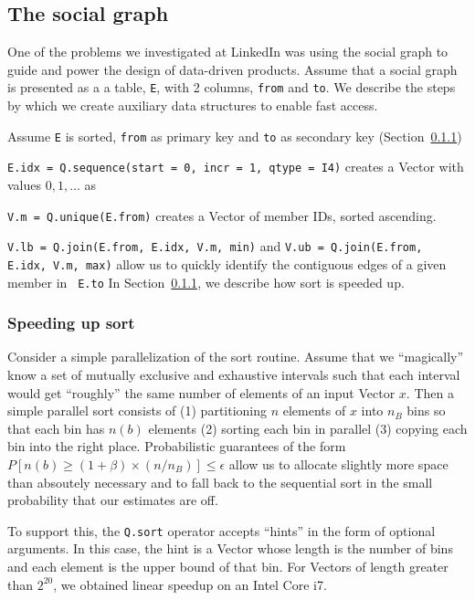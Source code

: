 \subsection{The social graph}
\label{social_graph}

One of the problems we investigated at LinkedIn was using the social graph to
guide and power the design of data-driven products.
Assume that a social graph is presented as a 
a table, {\tt E}, with 2 columns, {\tt from} and {\tt to}. We describe the steps
by which we create auxiliary data structures to enable fast access.
\be
\item Assume {\tt E} is sorted, {\tt from} as primary key and {\tt to} as
  secondary key (Section~\ref{par_sort})
\item 
  {\tt E.idx = Q.sequence({start = 0, incr = 1, qtype = I4})}
creates a Vector with values \(0, 1, \ldots\) as  
\item {\tt V.m = Q.unique(E.from)} creates a Vector of 
member IDs, sorted ascending. 
\item {\tt V.lb = Q.join(E.from, E.idx, V.m, min)}
and {\tt V.ub = Q.join(E.from, E.idx, V.m, max)}
allow us to quickly identify the contiguous edges of a given member in {\tt
E.to}
\ee
In Section~\ref{par_sort}, we describe how sort is speeded up.


\subsubsection{Speeding up sort}
\label{par_sort}
Consider a simple parallelization of the sort routine. Assume that we 
``magically'' know a set of mutually exclusive and exhaustive intervals such
that each interval would get ``roughly'' the same number of elements of an input
Vector \(x\). Then a simple parallel sort consists of 
(1) partitioning \(n\) elements of \(x\) into \(n_B\) bins so that each bin has
\(n(b)\) elements
(2) sorting each bin in parallel
(3) copying each bin into the right place. Probabilistic guarantees
of the form \(P[n(b) \geq (1+\beta) \times(n/n_B)] \leq \epsilon\) 
allow us to allocate slightly more space than absoutely necessary and to 
fall back to the sequential sort in the small probability that our estimates are off.

To support this, the {\tt Q.sort} operator accepts ``hints'' in the form of
optional arguments. In this case, the hint is a Vector whose length is the
number of bins and each element is the upper bound of that bin. For Vectors of
length greater than \(2^{20}\), we obtained linear speedup on an Intel Core i7.

